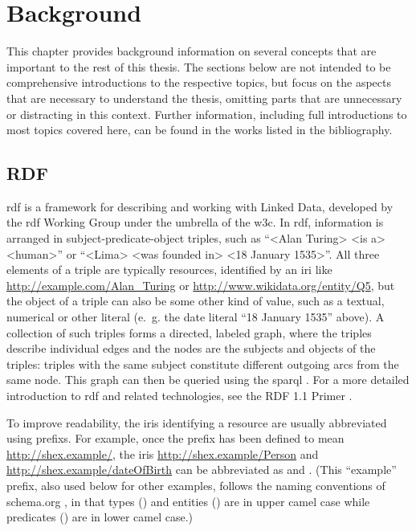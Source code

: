 
\chapter{Background}
\label{ch:Background}

This chapter provides background information
on several concepts that are important to the rest of this thesis.
The sections below are not intended to be comprehensive introductions to the respective topics,
but focus on the aspects that are necessary to understand the thesis,
omitting parts that are unnecessary or distracting in this context.
Further information, including full introductions to most topics covered here,
can be found in the works listed in the bibliography.

\section{RDF}
\label{sec:Background:RDF}

\acrfull{rdf}
\cite{Lanthaler:14:RCA}
is a framework for describing and working with \gls{Linked Data},
developed by the \gls{rdf} Working Group under the umbrella of the \gls{w3c}.
In \gls{rdf}, information is arranged in \gls{subject}-\gls{predicate}-\gls{object} \glspl{triple},
such as “<Alan Turing> <is a> <human>”
or “<Lima> <was founded in> <18 January 1535>”.
All three elements of a \gls{triple} are typically \glspl{resource},
identified by an \gls{iri} like \url{http://example.com/Alan_Turing} or \url{http://www.wikidata.org/entity/Q5},
but the \gls{object} of a \gls{triple} can also be some other kind of value,
such as a textual, numerical or other literal
(e.~g. the date literal “18 January 1535” above).
A collection of such \glspl{triple} forms a directed, labeled graph,
where the \glspl{triple} describe individual edges
and the nodes are the \glspl{subject} and \glspl{object} of the \glspl{triple}:
\glspl{triple} with the same \gls{subject} constitute different outgoing arcs from the same node.
This graph can then be queried using the \acrfull{sparql} \cite{9569543}.
For a more detailed introduction to \gls{rdf} and related technologies,
see the RDF 1.1 Primer \cite{Schreiber:14:RP}.

To improve readability, the \glspl{iri} identifying a \gls{resource}
are usually abbreviated using \glspl{prefix}.
For example, once the \gls{prefix}  has been defined to mean \url{http://shex.example/},
the \glspl{iri} \url{http://shex.example/Person} and \url{http://shex.example/dateOfBirth}
can be abbreviated as  and .
(This “example” \gls{prefix}, also used below for other examples,
follows the naming conventions of schema.org \cite{schema.org-old-extension},
in that types () and entities () are in \gls{upper camel case}
while predicates () are in \gls{lower camel case}.)

